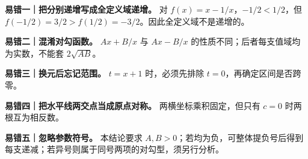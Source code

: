 \begin{trapbox}
\textbf{易错一｜把分别递增写成全定义域递增。} 对 $f(x)=x-1/x$，$-1/2<1/2$，但 $f(-1/2)=3/2>f(1/2)=-3/2$。因此全定义域不是递增的。

\textbf{易错二｜混淆对勾函数。} $Ax+B/x$ 与 $Ax-B/x$ 的性质不同；后者每支值域均为实数，不能套 $2\sqrt{AB}$。

\textbf{易错三｜换元后忘记范围。} $t=x+1$ 时，必须先排除 $t=0$，再确定区间是否跨零。

\textbf{易错四｜把水平线两交点当成原点对称。} 两横坐标乘积固定，但只有 $c=0$ 时两根互为相反数。

\textbf{易错五｜忽略参数符号。} 本结论要求 $A,B>0$；若均为负，可整体提负号后得到每支递减；若异号则属于同号两项的对勾型，须另行分析。
\end{trapbox}

